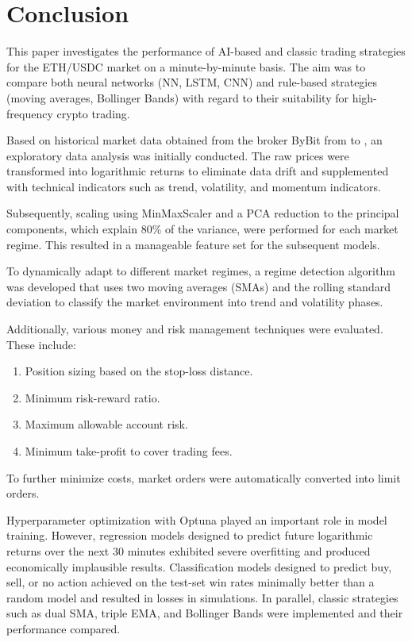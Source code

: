 \section{Conclusion}

This paper investigates the performance of AI-based and classic trading strategies for the ETH/USDC market on a minute-by-minute basis.
The aim was to compare both neural networks (NN, LSTM, CNN) and rule-based strategies (moving averages, Bollinger Bands) with regard to their suitability for high-frequency crypto trading.

Based on historical market data obtained from the broker ByBit from \ethDataStartDate to \ethDataEndDate, an exploratory data analysis was initially conducted.
The raw prices were transformed into logarithmic returns to eliminate data drift and supplemented with technical indicators such as trend, volatility, and momentum indicators.

Subsequently, scaling using MinMaxScaler and a PCA reduction to the principal components, which explain 80\% of the variance, were performed for each market regime.
This resulted in a manageable feature set for the subsequent models.

To dynamically adapt to different market regimes, a regime detection algorithm was developed that uses two moving averages (SMAs) and the rolling standard deviation to classify the market environment into trend and volatility phases.

Additionally, various money and risk management techniques were evaluated.
These include:

\begin{enumerate}
    \item Position sizing based on the stop-loss distance.
    \item Minimum risk-reward ratio.
    \item Maximum allowable account risk.
    \item Minimum take-profit to cover trading fees.
\end{enumerate}

\noindent
To further minimize costs, market orders were automatically converted into limit orders.

Hyperparameter optimization with Optuna played an important role in model training.
However, regression models designed to predict future logarithmic returns over the next 30 minutes exhibited severe overfitting and produced economically implausible results.
Classification models designed to predict buy, sell, or no action achieved on the test-set win rates minimally better than a random model and resulted in losses in simulations.
In parallel, classic strategies such as dual SMA, triple EMA, and Bollinger Bands were implemented and their performance compared.


